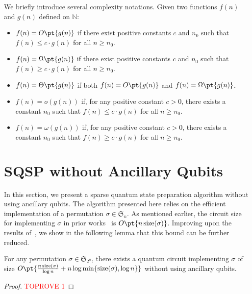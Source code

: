 \documentclass[a4paper,UKenglish,cleveref, autoref, thm-restate]{lipics-v2021}
\DeclarePairedDelimiter\cbra{\{}{\}}
\newcommand{\bo}{O\pt}
\newcommand{\om}{\Omega\pt}
\newcommand{\ta}{\Theta\pt}
\begin{document}
We briefly introduce several complexity notations. Given two functions $f(n) $ and $g(n) $ defined on $\mathbb{N}$:
\begin{itemize}
   \item $f(n) = \bo{g(n)} $ if there exist positive constants $c $ and $n_0$ such that $f(n) \leq c \cdot g(n) $ for all $n \geq n_0 $.  
   \item $f(n) = \om{g(n)} $ if there exist positive constants $c $ and $n_0$ such that $f(n) \geq c \cdot g(n) $ for all $n \geq n_0$.  
   \item $f(n) = \ta{g(n)} $ if both $f(n) = \bo{g(n)} $ and $f(n) = \om{g(n)} $.
     \item $f(n) = o(g(n))$ if, for any positive constant $ c > 0 $, there exists a constant $ n_0 $ such that $f(n) \leq c \cdot g(n)$ for all $n \geq n_0$.
    \item $f(n) = \omega(g(n))$ if, for any positive constant $ c > 0 $, there exists a constant $ n_0 $ such that $f(n) \geq c \cdot g(n)$ for all $n \geq n_0$.
\end{itemize}




\section{SQSP without Ancillary Qubits}\label{sec:without}

In this section, we present a sparse quantum state preparation algorithm without using ancillary qubits. The algorithm presented here relies on the efficient  implementation of a permutation $\sigma \in \mathfrak{S}_n$. 
As mentioned earlier, the circuit size for implementing $\sigma$ in prior works~\cite{malvetti2021quantum, ramacciotti2023simple} is $\bo{n\,\mathrm{size}(\sigma)}$. Improving upon the results of~\cite{zakablukov2017asymptotic, li2023asymptotically}, we show in the following lemma that this bound can be further reduced.

\begin{lemma}\label{lemma:sigma-restate}
For any permutation $\sigma \in \mathfrak{S}_{2^n}$, there exists a quantum circuit implementing $\sigma$ of size $\bo{\frac{n\,\mathrm{size}(\sigma)}{\log n} + n\log\min\cbra{\mathrm{size}(\sigma), \log n}}$ without using ancillary qubits. 

\end{lemma}


\begin{proof}\textcolor{red}{TOPROVE 1}\end{proof}
\end{document}
